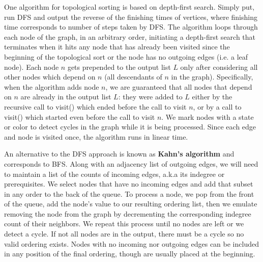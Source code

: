 \documentclass{article}
\begin{document}
    One algorithm for topological sorting is based on depth-first search. Simply put, run DFS and output the reverse of the finishing times of vertices, where finishing time corresponds to number of steps taken by DFS. The algorithm loops through each node of the graph, in an arbitrary order, initiating a depth-first search that terminates when it hits any node that has already been visited since the beginning of the topological sort or the node has no outgoing edges (i.e. a leaf node). Each node $n$ gets prepended to the output list $L$ only after considering all other nodes which depend on $n$ (all descendants of $n$ in the graph). Specifically, when the algorithm adds node $n$, we are guaranteed that all nodes that depend on $n$ are already in the output list $L$: they were added to $L$ either by the recursive call to visit() which ended before the call to visit $n$, or by a call to visit() which started even before the call to visit $n$. We mark nodes with a state or color to detect cycles in the graph while it is being processed. Since each edge and node is visited once, the algorithm runs in linear time. 

    An alternative to the DFS approach is known as \textbf{Kahn's algorithm} and corresponds to BFS. Along with an adjacency list of outgoing edges, we will need to maintain a list of the counts of incoming edges, a.k.a its indegree or prerequisites. We select nodes that have no incoming edges and add that subset in any order to the back of the queue. To process a node, we pop from the front of the queue, add the node's value to our resulting ordering list, then we emulate removing the node from the graph by decrementing the corresponding indegree count of their neighbors. We repeat this process until no nodes are left or we detect a cycle. If not all nodes are in the output, there must be a cycle so no valid ordering exists. Nodes with no incoming nor outgoing edges can be included in any position of the final ordering, though are usually placed at the beginning.
\end{document}
